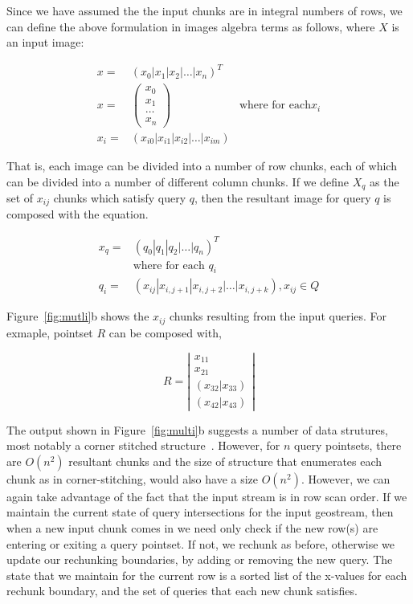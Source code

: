 \documentclass[10pt,letter]{article}
\begin{document}
\begin{multicols}{2}
Since we have assumed the the input chunks are in integral numbers of
rows, we can define the above formulation in images algebra terms as
follows, where $X$ is an input image:

\begin{align*}
x = & (x_0|x_1|x_2|\ldots|x_n)^T \\
x = & \left( \begin{array}{c}
    x_0 \\
    \hline
    x_1 \\
    \hline
    \ldots \\
    \hline
    x_n
  \end{array}\right)
  &\text{where for each} x_i \\
x_i = & (x_{i0}|x_{i1}|x_{i2}|\ldots|x_{im})
\end{align*}

That is, each image can be divided into a number of row chunks, each
of which can be divided into a number of different column chunks.  If
we define $X_q$ as the set of $x_{ij}$ chunks which satisfy query $q$,
then the resultant image for query $q$ is composed with the equation.

\begin{align*}
x_q =& (q_0|q_1|q_2|\ldots|q_n)^T \\
&\text{where for each } q_i \\
q_i =& (x_{ij}|x_{i,j+1}|x_{i,j+2}|\ldots|x_{i,j+k}), x_{ij} \in Q
\end{align*}

Figure~\ref{fig:mutli}b shows the $x_{ij}$ chunks resulting from the
input queries.  For exmaple, pointset $R$ can be composed with,

\[ R = \left| \begin{array}{c}
    x_{11} \\ 
    \hline 
    x_{21} \\
    \hline
    (x_{32}|x_{33}) \\
    \hline
    (x_{42}|x_{43})
  \end{array}
\right| \]

The output shown in Figure~\ref{fig:multi}b suggests a number of data
strutures, most notably a corner stitched
structure~\cite{ouster:84:corner-stitc}.  However, for $n$ query
pointsets, there are $O(n^2)$ resultant chunks and the size of
structure that enumerates each chunk as in corner-stitching, would
also have a size $O(n^2)$.  However, we can again take advantage of
the fact that the input stream is in row scan order.  If we maintain
the current state of query intersections for the input geostream, then
when a new input chunk comes in we need only check if the new row(s)
are entering or exiting a query pointset.  If not, we rechunk as
before, otherwise we update our rechunking boundaries, by adding or
removing the new query.  The state that we maintain for the current
row is a sorted list of the x-values for each rechunk boundary, and
the set of queries that each new chunk satisfies.


\end{multicols}
\end{document}
